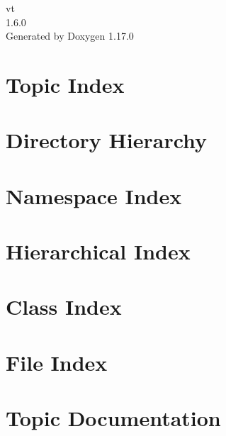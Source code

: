 \documentclass[twoside]{book}
\newcommand{\+}{\discretionary{\mbox{\scriptsize$\hookleftarrow$}}{}{}}
\newcommand{\clearemptydoublepage}{%
    \newpage{\pagestyle{empty}\cleardoublepage}%
  }
\begin{document}
  \raggedbottom
    \hypersetup{pageanchor=false,
                bookmarksnumbered=true,
                pdfencoding=unicode
               }
  \begin{titlepage}
  \vspace*{7cm}
  \begin{center}%
  {\Large vt}\\
  [1ex]\large 1.\+6.\+0 \\
  \vspace*{1cm}
  {\large Generated by Doxygen 1.17.0}\\
  \end{center}
  \end{titlepage}
  \clearemptydoublepage
  \tableofcontents
  \clearemptydoublepage
  \hypersetup{pageanchor=true}












\chapter{Topic Index}

\chapter{Directory Hierarchy}

\chapter{Namespace Index}

\chapter{Hierarchical Index}

\chapter{Class Index}

\chapter{File Index}

\chapter{Topic Documentation}





\end{document}
